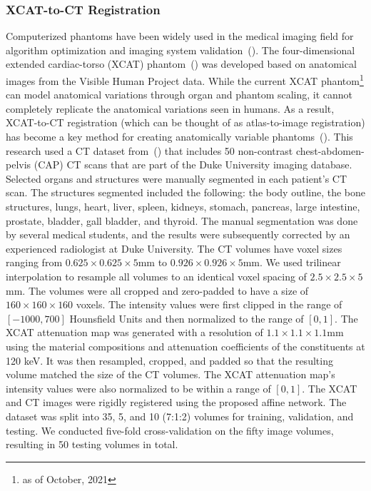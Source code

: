 \documentclass[times,twocolumn,final]{elsarticle}
\begin{document}
\subsubsection{XCAT-to-CT Registration}
Computerized phantoms have been widely used in the medical imaging field for algorithm optimization and imaging system validation~(\cite{Christoffersen2013, chen2019incorporating, zhang2017new}). The four-dimensional extended cardiac-torso (XCAT) phantom~(\cite{segars20104d}) was developed based on anatomical images from the Visible Human Project data. While the current XCAT phantom\footnote{as of October, 2021} can model anatomical variations through organ and phantom scaling, it cannot completely replicate the anatomical variations seen in humans. As a result, XCAT-to-CT registration (which can be thought of as atlas-to-image registration) has become a key method for creating anatomically variable phantoms~(\cite{chen2020generating, fu2021iphantom, segars2013population}). This research used a CT dataset from~(\cite{segars2013population}) that includes 50 non-contrast chest-abdomen-pelvis (CAP) CT scans that are part of the Duke University imaging database. Selected organs and structures were manually segmented in each patient's CT scan. The structures segmented included the following: the body outline, the bone structures, lungs, heart, liver, spleen, kidneys, stomach, pancreas, large intestine, prostate, bladder, gall bladder, and thyroid. The manual segmentation was done by several medical students, and the results were subsequently corrected by an experienced radiologist at Duke University. The CT volumes have voxel sizes ranging from $0.625\times0.625\times5$mm to $0.926\times0.926\times5$mm. We used trilinear interpolation to resample all volumes to an identical voxel spacing of $2.5\times2.5\times5$mm. The volumes were all cropped and zero-padded to have a size of $160\times160\times160$ voxels. The intensity values were first clipped in the range of $[-1000, 700]$ Hounsfield Units and then normalized to the range of $[0, 1]$. The XCAT attenuation map was generated with a resolution of $1.1\times1.1\times1.1$mm using the material compositions and attenuation coefficients of the constituents at 120 keV. It was then resampled, cropped, and padded so that the resulting volume matched the size of the CT volumes. The XCAT attenuation map's intensity values were also normalized to be within a range of $[0, 1]$. The XCAT and CT images were rigidly registered using the proposed affine network. The dataset was split into 35, 5, and 10 (7:1:2) volumes for training, validation, and testing. We conducted five-fold cross-validation on the fifty image volumes, resulting in 50 testing volumes in total.
\end{document}
